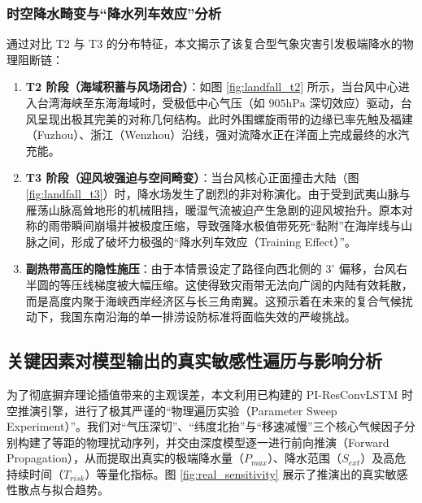 \documentclass[12pt,a4paper]{ctexart}
\begin{document}
\subsubsection{时空降水畸变与“降水列车效应”分析}
通过对比 T2 与 T3 的分布特征，本文揭示了该复合型气象灾害引发极端降水的物理阻断链：

\begin{enumerate}
    \item \textbf{T2 阶段（海域积蓄与风场闭合）}：如图 \ref{fig:landfall_t2} 所示，当台风中心进入台湾海峡至东海海域时，受极低中心气压（如 $905\text{hPa}$ 深切效应）驱动，台风呈现出极其完美的对称几何结构。此时外围螺旋雨带的边缘已率先触及福建（Fuzhou）、浙江（Wenzhou）沿线，强对流降水正在洋面上完成最终的水汽充能。
    
    \item \textbf{T3 阶段（迎风坡强迫与空间畸变）}：当台风核心正面撞击大陆（图 \ref{fig:landfall_t3}）时，降水场发生了剧烈的非对称演化。由于受到武夷山脉与雁荡山脉高耸地形的机械阻挡，暖湿气流被迫产生急剧的迎风坡抬升。原本对称的雨带瞬间崩塌并被极度压缩，导致强降水极值带死死“黏附”在海岸线与山脉之间，形成了破坏力极强的“降水列车效应（Training Effect）”。
    
    \item \textbf{副热带高压的隐性施压}：由于本情景设定了路径向西北侧的 $3^\circ$ 偏移，台风右半圆的等压线梯度被大幅压缩。这使得致灾雨带无法向广阔的内陆有效耗散，而是高度内聚于海峡西岸经济区与长三角南翼。这预示着在未来的复合气候扰动下，我国东南沿海的单一排涝设防标准将面临失效的严峻挑战。
\end{enumerate}

\subsection{关键因素对模型输出的真实敏感性遍历与影响分析}

为了彻底摒弃理论插值带来的主观误差，本文利用已构建的 PI-ResConvLSTM 时空推演引擎，进行了极其严谨的“物理遍历实验（Parameter Sweep Experiment）”。我们对“气压深切”、“纬度北抬”与“移速减慢”三个核心气候因子分别构建了等距的物理扰动序列，并交由深度模型逐一进行前向推演（Forward Propagation），从而提取出真实的极端降水量（$P_{max}$）、降水范围（$S_{ext}$）及高危持续时间（$T_{risk}$）等量化指标。图 \ref{fig:real_sensitivity} 展示了推演出的真实敏感性散点与拟合趋势。
\end{document}
